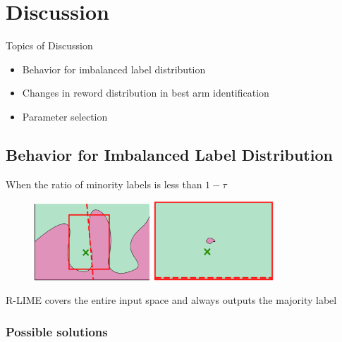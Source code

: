 \documentclass[aspectratio=169]{slide-en}
\begin{document}
\section{Discussion}

\begin{frame}{}
  Topics of Discussion
  \begin{itemize}
    \item Behavior for imbalanced label distribution
    \item Changes in reword distribution in best arm identification
    \item Parameter selection
  \end{itemize}
\end{frame}

\subsection{Behavior for Imbalanced Label Distribution}

\begin{frame}{}
  When the ratio of minority labels is less than $1-\tau$
  \begin{figure}
    \centering
    \includegraphics[width=0.39\textwidth]{visual-rlime3}
    \hspace{1em}
    \includegraphics[width=0.4\textwidth]{visual-rlime-imbalanced}
  \end{figure}
  R-LIME covers the entire input space and always outputs the majority label
\end{frame}

\subsubsection{Possible solutions}
\end{document}
